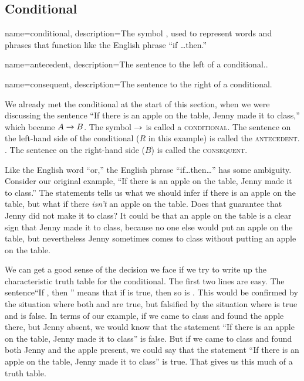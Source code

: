\subsection{Conditional}

{
name=conditional,
description={The symbol \eif, used to represent words and phrases that function like the English phrase ``if \ldots then.''}
}

{
name=antecedent,
description={The sentence to the left of a conditional..}
}

{
name=consequent,
description={The sentence to the right of a conditional.}
}

We already met the conditional at the start of this section, when we were discussing the sentence ``If there is an apple on the table, Jenny made it to class,'' which became $A \rightarrow B$. The symbol $\rightarrow$ is called a \textsc{\gls{conditional}}. \label{def:conditional} The sentence on the left-hand side of the conditional ($R$ in this example) is called the \textsc{\gls{antecedent}}. \label{def:antecedent}.  The sentence on the right-hand side ($B$) is called the \textsc{\gls{consequent}}. \label{def:consequent}

Like the English word ``or,'' the English phrase ``if\ldots then\ldots'' has some ambiguity. Consider our original example, ``If there is an apple on the table, Jenny made it to class.'' The statements tells us what we should infer if there is an apple on the table, but what if there \emph{isn't} an apple on the table. Does that guarantee that Jenny did not make it to class? It could be that an apple on the table is a clear sign that Jenny made it to class, because no one else would put an apple on the table, but nevertheless Jenny sometimes comes to class without putting an apple on the table.

We can get a good sense of the decision we face if we try to write up the characteristic truth table for the conditional. The first two lines are easy. The sentence``If , then '' means that if  is true, then so is . This would be confirmed by the situation where both  and  are true, but falsified by the situation where  is true and  is false. In terms of our example, if we came to class and found the apple there, but Jenny absent, we would know that the statement ``If there is an apple on the table, Jenny made it to class'' is false. But if we came to class and found both Jenny and the apple present, we could say that the statement ``If there is an apple on the table, Jenny made it to class'' is true. That gives us this much of a truth table.


